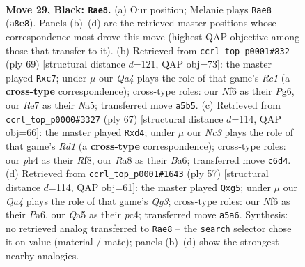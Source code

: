 \documentclass[11pt]{article}
\begin{document}
\clearpage

\begin{figure}[p]\centering
\begin{subfigure}{0.46\textwidth}\centering
\resizebox{\linewidth}{!}{%
\newchessgame
\chessboard[
  setfen={r4k2/Pb2rp2/1pn2n2/qN1p1BN1/P2P2pP/6R1/2Q2K2/7R b - - 1 29},
  showmover=false,
  pgfstyle=straightmove, color=movearrow, markmove={a8-e8}
]}
\caption{}
\end{subfigure}\hfill
\begin{subfigure}{0.46\textwidth}\centering
\resizebox{\linewidth}{!}{%
\newchessgame
\chessboard[
  setfen={2r5/2Nq1r1k/p2pN1p1/np4Pp/2n1P2P/P2R4/1PR5/K2Q4 b - - 9 35},
  showmover=false,
  pgfstyle=straightmove, color=movearrow, markmove={c8-c7}
]}
\caption{}
\end{subfigure}
\\[4pt]
\begin{subfigure}{0.46\textwidth}\centering
\resizebox{\linewidth}{!}{%
\newchessgame
\chessboard[
  setfen={3r1rk1/pP3ppp/bq6/N3nNP1/3R4/2Qn4/1P4BP/R6K b - - 2 34},
  showmover=false,
  pgfstyle=straightmove, color=movearrow, markmove={d8-d4}
]}
\caption{}
\end{subfigure}\hfill
\begin{subfigure}{0.46\textwidth}\centering
\resizebox{\linewidth}{!}{%
\newchessgame
\chessboard[
  setfen={2k5/3r1pb1/p5q1/1ppnn1N1/2P1R3/1P6/PB1P1Q2/2K2B2 b - - 0 29},
  showmover=false,
  pgfstyle=straightmove, color=movearrow, markmove={g6-g5}
]}
\caption{}
\end{subfigure}
\caption{\textbf{Move 29, Black: \texttt{Rae8}.} (a) Our position; Melanie plays \texttt{Rae8} (\texttt{a8e8}). Panels (b)--(d) are the retrieved master positions whose correspondence most drove this move (highest QAP objective among those that transfer to it). (b) Retrieved from \texttt{ccrl\_top\_p0001\#832} (ply 69) [structural distance $d$=121, QAP obj=73]: the master played \texttt{Rxc7}; under $\mu$ our \emph{Qa4} plays the role of that game's \emph{Rc1} (a \textbf{cross-type} correspondence); cross-type roles: our \emph{N}f6 as their \emph{P}g6, our \emph{R}e7 as their \emph{N}a5; transferred move \texttt{a5b5}. (c) Retrieved from \texttt{ccrl\_top\_p0000\#3327} (ply 67) [structural distance $d$=114, QAP obj=66]: the master played \texttt{Rxd4}; under $\mu$ our \emph{Nc3} plays the role of that game's \emph{Rd1} (a \textbf{cross-type} correspondence); cross-type roles: our \emph{p}h4 as their \emph{R}f8, our \emph{R}a8 as their \emph{B}a6; transferred move \texttt{c6d4}. (d) Retrieved from \texttt{ccrl\_top\_p0001\#1643} (ply 57) [structural distance $d$=114, QAP obj=61]: the master played \texttt{Qxg5}; under $\mu$ our \emph{Qa4} plays the role of that game's \emph{Qg3}; cross-type roles: our \emph{N}f6 as their \emph{P}a6, our \emph{Q}a5 as their \emph{p}c4; transferred move \texttt{a5a6}. Synthesis: no retrieved analog transferred to \texttt{Rae8} -- the \texttt{search} selector chose it on value (material / mate); panels (b)--(d) show the strongest nearby analogies.}
\label{fig:thought-m57}
\end{figure}
\end{document}
